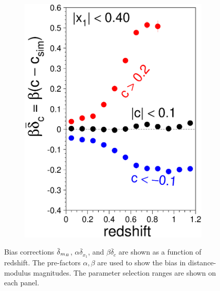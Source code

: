 \documentclass[11pt,a4paper]{paper}
\begin{document}
\begin{figure}[htbp!]
\begin{subfigure}[t]{.20\linewidth}
        \includegraphics[width=\linewidth]{Answer_figures/Fig_biasCor_c.eps}
    \end{subfigure}
    \captionsetup{justification=centering}
    \caption{Bias corrections $\mkern
        1.5mu\overline{\mkern-1.5mu\delta\mkern-1.5mu}\mkern 1.5mu_{m_B}$,
        $\alpha \overline{\delta}_{x_1}$, and $\beta\overline{\delta}_{c}$ are
        shown as a function of redshift. The pre-factors $\alpha, \beta$ are
        used to show the bias in distance-modulus magnitudes. The parameter
    selection ranges are shown on each panel.}
    \label{fig:KS17}
\end{figure}
\end{document}
